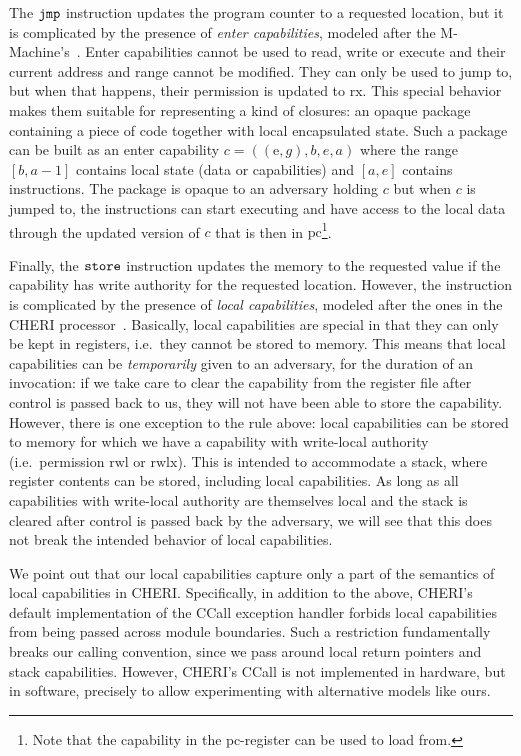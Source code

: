 \documentclass[compsoc,conference,letterpaper,fleqn]{IEEEtran}
\newcommand\lau[1]{{\color{purple} \sf \footnotesize {LS: #1}}\\}
\renewcommand\lau[1]{}
\newcommand{\var}[1]{\mathit{#1}}
\newcommand{\gl}{\var{g}}
\newcommand{\pcreg}{\mathrm{pc}}
\newcommand{\addr}{\var{a}}
\newcommand{\start}{\var{b}}
\newcommand{\addrend}{\var{e}}
\newcommand{\zinstr}[1]{\mathtt{#1}}
\newcommand{\oneinstr}[2]{
  \ifthenelse{\equal{#2}{}}
  {\zinstr{#1}}
  {\zinstr{#1} \; #2}
}
\newcommand{\jmp}[1]{\oneinstr{jmp}{#1}}
\newcommand{\twoinstr}[3]{
  \ifthenelse{\equal{#2#3}{}}
  {\zinstr{#1}}
  {\zinstr{#1} \; #2 \; #3}
}
\newcommand{\store}[2]{\twoinstr{store}{#1}{#2}}
\newcommand{\plainperm}[1]{\mathrm{#1}}
\newcommand{\exec}{\plainperm{rx}}
\newcommand{\entry}{\plainperm{e}}
\newcommand{\readwritel}{\plainperm{rwl}}
\newcommand{\rwl}{\readwritel}
\newcommand{\rwlx}{\plainperm{rwlx}}
\begin{document}
The $\jmp{}$ instruction updates the program counter to a requested location,
but it is complicated by the presence of \emph{enter capabilities}, modeled
after the M-Machine's~\cite{Carter:1994:HSF:195473.195579}. Enter capabilities
cannot be used to read, write or execute and their current address and range
cannot be modified. They can only be used to jump to, but when that happens,
their permission is updated to $\exec$. This special behavior makes them
suitable for representing a kind of closures: an opaque package containing a
piece of code together with local encapsulated state. Such a package can be
built as an enter capability $c = ((\entry,\gl),\start,\addrend,\addr)$ where
the range $[\start,\addr-1]$ contains local state (data or capabilities) and
$[\addr,\addrend]$ contains instructions. The package is opaque to an adversary
holding $c$ but when $c$ is jumped to, the instructions can start executing and
have access to the local data through the updated version of $c$ that is then in
$\pcreg$\footnote{Note that the capability in the $\pcreg$-register can be used
  to load from.}.

Finally, the $\store{}{}$ instruction updates the memory to the requested value
if the capability has write authority for the requested location. However, the
instruction is complicated by the presence of \emph{local capabilities}, modeled
after the ones in the CHERI processor~\cite{Watson2015Cheri}. Basically, local
capabilities are special in that they can only be kept in registers, i.e.\ they
cannot be stored to memory. This means that local capabilities can be
\emph{temporarily} given to an adversary, for the duration of an invocation: if
we take care to clear the capability from the register file after control is
passed back to us, they will not have been able to store the capability.
However, there is one exception to the rule above: local capabilities can be
stored to memory for which we have a capability with write-local authority
(i.e.\ permission $\rwl$ or $\rwlx$). This is intended to accommodate a stack,
where register contents can be stored, including local capabilities. As long as all
capabilities with write-local authority are themselves local and the stack is
cleared after control is passed back by the adversary, we will see that this
does not break the intended behavior of local capabilities.

We point out that our local capabilities capture only a part of the semantics of
local capabilities in CHERI. Specifically, in addition to the above, CHERI's
default implementation of the CCall exception handler forbids local capabilities
from being passed across module boundaries. Such a restriction fundamentally
breaks our calling convention, since we pass around local return pointers and
stack capabilities. However, CHERI's CCall is not implemented in hardware, but
in software, precisely to allow experimenting with alternative models like ours.
\end{document}
